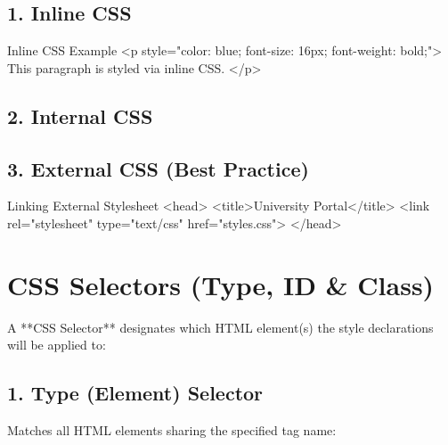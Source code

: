 \subsection{1. Inline CSS}
\begin{htmlcode}{Inline CSS Example}
<p style="color: blue; font-size: 16px; font-weight: bold;">
    This paragraph is styled via inline CSS.
</p>
\end{htmlcode}

\subsection{2. Internal CSS}

\subsection{3. External CSS (Best Practice)}
\begin{htmlcode}{Linking External Stylesheet}
<head>
    <title>University Portal</title>
    <link rel="stylesheet" type="text/css" href="styles.css">
</head>
\end{htmlcode}


\section{CSS Selectors (Type, ID \& Class)}

A **CSS Selector** designates which HTML element(s) the style declarations will be applied to:

\subsection{1. Type (Element) Selector}
Matches all HTML elements sharing the specified tag name:

